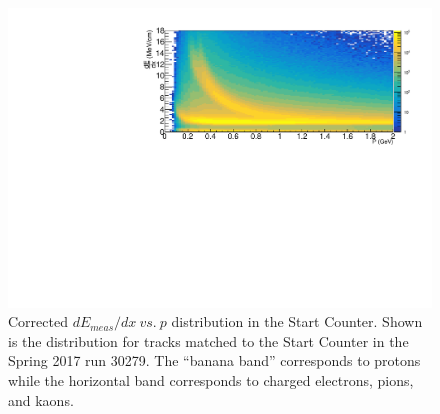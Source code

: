 	\begin{figure}[!htb]
	\centering
	\includegraphics[width=1.0\textwidth]{calibration/figs/ATT_corr}
	\caption{Corrected $dE_{meas}/dx\ vs.\ p$ distribution in the Start Counter.  Shown is the distribution for tracks matched to the Start Counter in the Spring 2017 run 30279. The ``banana band'' corresponds to protons while the horizontal band corresponds to charged electrons, pions, and kaons.}
	\label{fig:dEdx_vs_p_uncorr}
	\end{figure}
